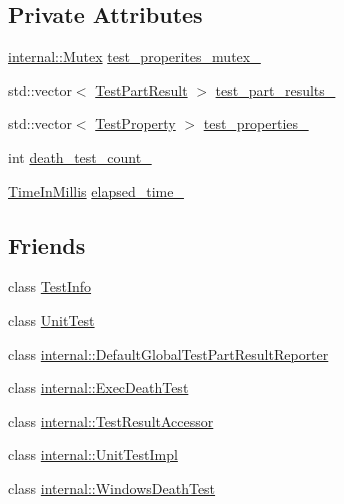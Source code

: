\subsection*{\-Private \-Attributes}
\begin{DoxyCompactItemize}
\item 
\hyperlink{classtesting_1_1internal_1_1Mutex}{internal\-::\-Mutex} \hyperlink{classtesting_1_1TestResult_ae28fd07e38c889d9a31c99a2c9bfccc2}{test\-\_\-properites\-\_\-mutex\-\_\-}
\item 
std\-::vector$<$ \hyperlink{classtesting_1_1TestPartResult}{\-Test\-Part\-Result} $>$ \hyperlink{classtesting_1_1TestResult_ac2f4a65d121ee86aa2e19daed6269c2d}{test\-\_\-part\-\_\-results\-\_\-}
\item 
std\-::vector$<$ \hyperlink{classtesting_1_1TestProperty}{\-Test\-Property} $>$ \hyperlink{classtesting_1_1TestResult_aa0515640923d388f1495ae2622cb76f9}{test\-\_\-properties\-\_\-}
\item 
int \hyperlink{classtesting_1_1TestResult_aa8b0cbfd87e7104bed9e7713972d0f8f}{death\-\_\-test\-\_\-count\-\_\-}
\item 
\hyperlink{namespacetesting_a338e9fd9474f0d8fafcb28b05f66a630}{\-Time\-In\-Millis} \hyperlink{classtesting_1_1TestResult_a97b9c166ebee95ae4c9ef26cf3155617}{elapsed\-\_\-time\-\_\-}
\end{DoxyCompactItemize}
\subsection*{\-Friends}
\begin{DoxyCompactItemize}
\item 
class \hyperlink{classtesting_1_1TestResult_aed3c96e2bd5a46339c1cbe49a4a233ee}{\-Test\-Info}
\item 
class \hyperlink{classtesting_1_1TestResult_aaeb07ea6ba11473f5b2ff2067a1d734a}{\-Unit\-Test}
\item 
class \hyperlink{classtesting_1_1TestResult_ac731f0389a3fc3cae64a80a5e53acc2a}{internal\-::\-Default\-Global\-Test\-Part\-Result\-Reporter}
\item 
class \hyperlink{classtesting_1_1TestResult_a6a009268369159ee3ff3d162e5c9f0b4}{internal\-::\-Exec\-Death\-Test}
\item 
class \hyperlink{classtesting_1_1TestResult_a9409280e3d708ddb050e1b9922b91522}{internal\-::\-Test\-Result\-Accessor}
\item 
class \hyperlink{classtesting_1_1TestResult_aa684cc13a8f91b00c0c9ce41ec7474eb}{internal\-::\-Unit\-Test\-Impl}
\item 
class \hyperlink{classtesting_1_1TestResult_ab7ea7e66d98b6380f6216e44ce744390}{internal\-::\-Windows\-Death\-Test}
\end{DoxyCompactItemize}


